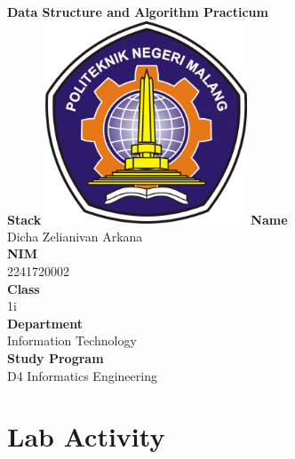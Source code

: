 \documentclass[12pt,titlepage]{article}
\newcommand{\vSubject}{Data Structure and Algorithm Practicum}
\newcommand{\vSubtitle}{Stack}
\newcommand{\vName}{Dicha Zelianivan Arkana}
\newcommand{\vNIM}{2241720002}
\newcommand{\vClass}{1i}
\newcommand{\vDepartment}{Information Technology}
\newcommand{\vStudyProgram}{D4 Informatics Engineering}
\begin{document}
\begin{titlepage}
    \centering
    \vfill
    {\bfseries\LARGE
        \vSubject\\
        \vskip0.25cm
        \vSubtitle
    }
    \vfill
    \includegraphics[width=6cm]{images/polinema-logo.png}
    \vfill
    {
        \textbf{Name}\\
        \vName\\
        \vskip0.5cm
        \textbf{NIM}\\
        \vNIM\\
        \vskip0.5cm
        \textbf{Class}\\
        \vClass\\
        \vskip0.5cm
        \textbf{Department}\\
        \vDepartment\\
        \vskip0.5cm
        \textbf{Study Program}\\
        \vStudyProgram
    }
\end{titlepage}

\section{Lab Activity}
\end{document}
